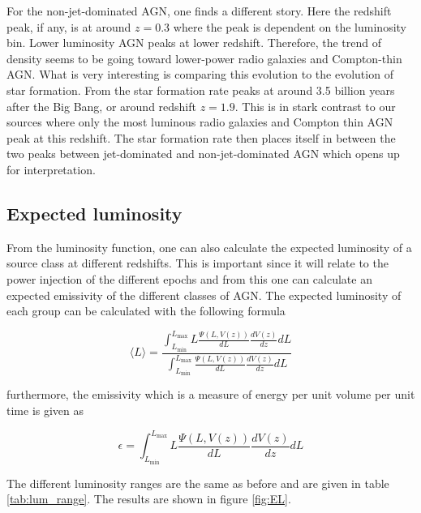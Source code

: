 For the non-jet-dominated AGN, one finds a different story. Here the redshift peak, if any, is at around $z=0.3$ where the peak is dependent on the luminosity bin. Lower luminosity AGN peaks at lower redshift. Therefore, the trend of density 
seems to be going toward lower-power radio galaxies and Compton-thin AGN. 
What is very interesting is comparing this evolution to 
the evolution of star formation. From \cite{Madau_2014} the star formation rate peaks at around 3.5 billion years after the Big Bang, 
or around redshift $z= 1.9$. This is in stark contrast to our sources where only the most luminous radio galaxies and Compton thin AGN peak at this redshift. 
The star formation rate then places itself in between the two peaks between jet-dominated and non-jet-dominated AGN which opens up for interpretation. 


\subsection{Expected luminosity}
\label{sec:Expt_lum}
From the luminosity function, one can also calculate the expected luminosity of a source class at different redshifts. This is important since it will  relate to the 
power injection of the different epochs and from this one can calculate an expected emissivity of the different classes of AGN. 
The expected luminosity of each group can be calculated with the following formula

\begin{equation}
    \langle L \rangle = \frac{\int_{L_{\text{min}}}^{L_{\text{max}}} L \frac{\Psi(L, V(z))}{dL} \frac{dV(z)}{dz} dL}{\int_{L_{\text{min}}}^{L_{\text{max}}} \frac{\Psi(L, V(z))}{dL} \frac{dV(z)}{dz} dL}
\end{equation}

furthermore, the emissivity which is a measure of energy per unit volume per unit time is given as


\begin{equation}
     \epsilon  = \int_{L_{\text{min}}}^{L_{\text{max}}} L \frac{\Psi(L, V(z))}{dL} \frac{dV(z)}{dz} dL
\end{equation}

The different luminosity ranges are the same as before and are given in table \ref{tab:lum_range}. The results are shown in figure \ref{fig:EL}.

